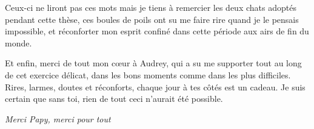 \vspace{\merciSpace}

Ceux-ci ne liront pas ces mots mais je tiens à remercier les deux chats adoptés pendant cette thèse, ces boules de poils ont su me faire rire quand je le pensais impossible, et réconforter mon esprit confiné dans cette période aux airs de fin du monde.

\vspace{\merciSpace}

Et enfin, merci de tout mon cœur à Audrey, qui a su me supporter tout au long de cet exercice délicat, dans les bons moments comme dans les plus difficiles. Rires, larmes, doutes et réconforts, chaque jour à tes côtés est un cadeau. Je suis certain que sans toi, rien de tout ceci n'aurait été possible.

\newpage

\mbox{}

\vspace*{\fill}

\begin{flushright}
\textit{Merci Papy, merci pour tout}
\end{flushright}

\vspace*{\fill}

\fi